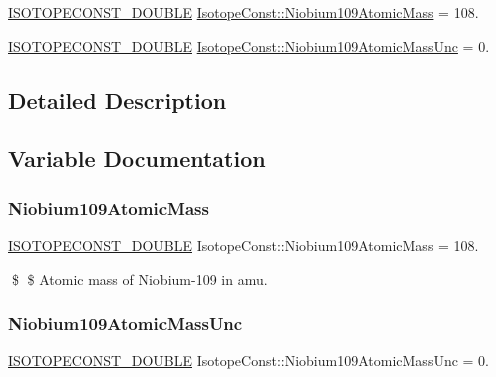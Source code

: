 \begin{DoxyCompactItemize}
\item 
\mbox{\hyperlink{group___isotope_const-_macros_ga8f45a7272ce02c0b4c65c44636ed719a}{I\+S\+O\+T\+O\+P\+E\+C\+O\+N\+S\+T\+\_\+\+D\+O\+U\+B\+LE}} \mbox{\hyperlink{group___isotope_const-_niobium-_nb109_ga645580716d9e00c76e34533382e28124}{Isotope\+Const\+::\+Niobium109\+Atomic\+Mass}} = 108.
\item 
\mbox{\hyperlink{group___isotope_const-_macros_ga8f45a7272ce02c0b4c65c44636ed719a}{I\+S\+O\+T\+O\+P\+E\+C\+O\+N\+S\+T\+\_\+\+D\+O\+U\+B\+LE}} \mbox{\hyperlink{group___isotope_const-_niobium-_nb109_ga40ece3d9483c1e7428c41ff2e6ede56a}{Isotope\+Const\+::\+Niobium109\+Atomic\+Mass\+Unc}} = 0.
\end{DoxyCompactItemize}


\subsection{Detailed Description}


\subsection{Variable Documentation}
\mbox{\label{group___isotope_const-_niobium-_nb109_ga645580716d9e00c76e34533382e28124}} 
\subsubsection{\texorpdfstring{Niobium109\+Atomic\+Mass}{Niobium109AtomicMass}}
{\footnotesize\ttfamily \mbox{\hyperlink{group___isotope_const-_macros_ga8f45a7272ce02c0b4c65c44636ed719a}{I\+S\+O\+T\+O\+P\+E\+C\+O\+N\+S\+T\+\_\+\+D\+O\+U\+B\+LE}} Isotope\+Const\+::\+Niobium109\+Atomic\+Mass = 108.}

\$ \$ Atomic mass of Niobium-\/109 in amu. \mbox{\label{group___isotope_const-_niobium-_nb109_ga40ece3d9483c1e7428c41ff2e6ede56a}} 
\subsubsection{\texorpdfstring{Niobium109\+Atomic\+Mass\+Unc}{Niobium109AtomicMassUnc}}
{\footnotesize\ttfamily \mbox{\hyperlink{group___isotope_const-_macros_ga8f45a7272ce02c0b4c65c44636ed719a}{I\+S\+O\+T\+O\+P\+E\+C\+O\+N\+S\+T\+\_\+\+D\+O\+U\+B\+LE}} Isotope\+Const\+::\+Niobium109\+Atomic\+Mass\+Unc = 0.}

